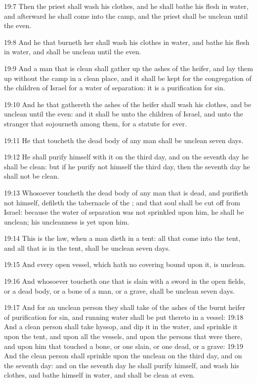 19:7 Then the priest shall wash his clothes, and he shall bathe his flesh in water, and afterward he shall come into the camp, and the priest shall be unclean until the even.

19:8 And he that burneth her shall wash his clothes in water, and bathe his flesh in water, and shall be unclean until the even.

19:9 And a man that is clean shall gather up the ashes of the heifer, and lay them up without the camp in a clean place, and it shall be kept for the congregation of the children of Israel for a water of separation: it is a purification for sin.

19:10 And he that gathereth the ashes of the heifer shall wash his clothes, and be unclean until the even: and it shall be unto the children of Israel, and unto the stranger that sojourneth among them, for a statute for ever.

19:11 He that toucheth the dead body of any man shall be unclean seven days.

19:12 He shall purify himself with it on the third day, and on the seventh day he shall be clean: but if he purify not himself the third day, then the seventh day he shall not be clean.

19:13 Whosoever toucheth the dead body of any man that is dead, and purifieth not himself, defileth the tabernacle of the \LORD; and that soul shall be cut off from Israel: because the water of separation was not sprinkled upon him, he shall be unclean; his uncleanness is yet upon him.

19:14 This is the law, when a man dieth in a tent: all that come into the tent, and all that is in the tent, shall be unclean seven days.

19:15 And every open vessel, which hath no covering bound upon it, is unclean.

19:16 And whosoever toucheth one that is slain with a sword in the open fields, or a dead body, or a bone of a man, or a grave, shall be unclean seven days.

19:17 And for an unclean person they shall take of the ashes of the burnt heifer of purification for sin, and running water shall be put thereto in a vessel: 19:18 And a clean person shall take hyssop, and dip it in the water, and sprinkle it upon the tent, and upon all the vessels, and upon the persons that were there, and upon him that touched a bone, or one slain, or one dead, or a grave: 19:19 And the clean person shall sprinkle upon the unclean on the third day, and on the seventh day: and on the seventh day he shall purify himself, and wash his clothes, and bathe himself in water, and shall be clean at even.

